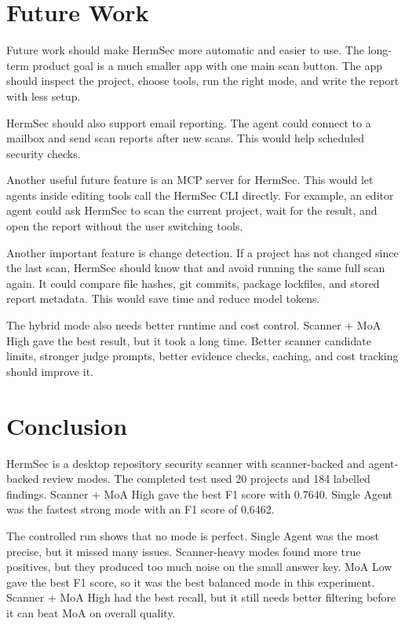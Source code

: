 \documentclass[sigconf,nonacm]{acmart}
\begin{document}
\section{Future Work}

Future work should make HermSec more automatic and easier to use. The long-term product goal is a much smaller app with one main scan button. The app should inspect the project, choose tools, run the right mode, and write the report with less setup.

HermSec should also support email reporting. The agent could connect to a mailbox and send scan reports after new scans. This would help scheduled security checks.

Another useful future feature is an MCP server for HermSec. This would let agents inside editing tools call the HermSec CLI directly. For example, an editor agent could ask HermSec to scan the current project, wait for the result, and open the report without the user switching tools.

Another important feature is change detection. If a project has not changed since the last scan, HermSec should know that and avoid running the same full scan again. It could compare file hashes, git commits, package lockfiles, and stored report metadata. This would save time and reduce model tokens.

The hybrid mode also needs better runtime and cost control. Scanner + MoA High gave the best result, but it took a long time. Better scanner candidate limits, stronger judge prompts, better evidence checks, caching, and cost tracking should improve it.

\section{Conclusion}

HermSec is a desktop repository security scanner with scanner-backed and agent-backed review modes. The completed test used 20 projects and 184 labelled findings. Scanner + MoA High gave the best F1 score with 0.7640. Single Agent was the fastest strong mode with an F1 score of 0.6462.

The controlled run shows that no mode is perfect. Single Agent was the most precise, but it missed many issues. Scanner-heavy modes found more true positives, but they produced too much noise on the small answer key. MoA Low gave the best F1 score, so it was the best balanced mode in this experiment. Scanner + MoA High had the best recall, but it still needs better filtering before it can beat MoA on overall quality.
\end{document}
